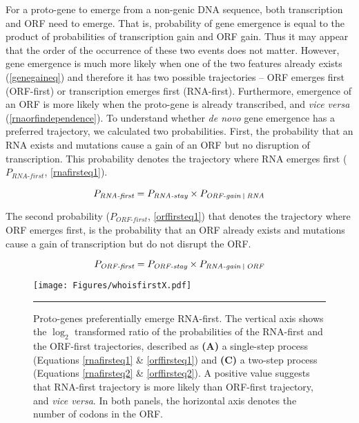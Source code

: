 \documentclass[12pt,a4paper]{article}
\begin{document}
For a proto-gene to emerge from a non-genic DNA sequence, both transcription and ORF need to emerge. That is, probability of gene emergence is equal to the product of probabilities of transcription gain and ORF gain. Thus it may appear that the order of the occurrence of these two events does not matter. However, gene emergence is much more likely when one of the two features already exists (\autoref{genegaineq}) and therefore it has two possible trajectories -- ORF emerges first (ORF-first) or transcription emerges first (RNA-first). Furthermore, emergence of an ORF is more likely when the proto-gene is already transcribed, and \textit{vice versa} (\autoref{rnaorfindependence}). To understand whether \textit{de novo} gene emergence has a preferred trajectory, we calculated two probabilities. First, the probability that an RNA exists and mutations cause a gain of an ORF but no disruption of transcription. This probability denotes the trajectory where RNA emerges first ($P_\textit{RNA-first}$, \autoref{rnafirsteq1}). 

\begin{equation}
P_\textit{RNA-first} = P_\textit{RNA-stay}\times P_\textit{ORF-gain \vline\ RNA}
\label{rnafirsteq1}
\end{equation}

The second probability ($P_\textit{ORF-first}$, \autoref{orffirsteq1}) that denotes the trajectory where ORF emerges first, is the probability that an ORF already exists and mutations cause a gain of transcription but do not disrupt the ORF.

\begin{equation}
P_\textit{ORF-first} = P_\textit{ORF-stay}\times P_\textit{RNA-gain \vline\ ORF}
\label{orffirsteq1}
\end{equation}


\begin{figure}[!t]
\centering
\texttt{[image: Figures/whoisfirstX.pdf]}
\caption{Proto-genes preferentially emerge RNA-first. The vertical axis shows the $\log_2$ transformed ratio of the probabilities of the RNA-first and the ORF-first trajectories, described as \textbf{(A)} a single-step process (Equations \ref{rnafirsteq1} \& \ref{orffirsteq1}) and \textbf{(C)} a two-step process (Equations \ref{rnafirsteq2} \& \ref{orffirsteq2}). A positive value suggests that RNA-first trajectory is more likely than ORF-first trajectory, and \textit{vice versa}. In both panels, the horizontal axis denotes the number of codons in the ORF.}
\label{whoisfirst}
\vspace{1ex}
\hrule
\end{figure}
\end{document}
